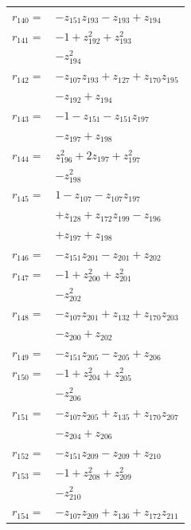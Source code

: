 \begin{longtable}{@{}r@{\;}l@{}}
\(r_{140}=\) & \(\displaystyle -z_{151}z_{193} -z_{193} +z_{194}\) \\[3pt]
\(r_{141}=\) & \(\displaystyle -1 +z_{192}^{2} +z_{193}^{2}\) \\
 & \(\displaystyle -z_{194}^{2}\) \\[3pt]
\(r_{142}=\) & \(\displaystyle -z_{107}z_{193} +z_{127} +z_{170}z_{195}\) \\
 & \(\displaystyle -z_{192} +z_{194}\) \\[3pt]
\(r_{143}=\) & \(\displaystyle -1 -z_{151} -z_{151}z_{197}\) \\
 & \(\displaystyle -z_{197} +z_{198}\) \\[3pt]
\(r_{144}=\) & \(\displaystyle z_{196}^{2} +2z_{197} +z_{197}^{2}\) \\
 & \(\displaystyle -z_{198}^{2}\) \\[3pt]
\(r_{145}=\) & \(\displaystyle 1 -z_{107} -z_{107}z_{197}\) \\
 & \(\displaystyle +z_{128} +z_{172}z_{199} -z_{196}\) \\
 & \(\displaystyle +z_{197} +z_{198}\) \\[3pt]
\(r_{146}=\) & \(\displaystyle -z_{151}z_{201} -z_{201} +z_{202}\) \\[3pt]
\(r_{147}=\) & \(\displaystyle -1 +z_{200}^{2} +z_{201}^{2}\) \\
 & \(\displaystyle -z_{202}^{2}\) \\[3pt]
\(r_{148}=\) & \(\displaystyle -z_{107}z_{201} +z_{132} +z_{170}z_{203}\) \\
 & \(\displaystyle -z_{200} +z_{202}\) \\[3pt]
\(r_{149}=\) & \(\displaystyle -z_{151}z_{205} -z_{205} +z_{206}\) \\[3pt]
\(r_{150}=\) & \(\displaystyle -1 +z_{204}^{2} +z_{205}^{2}\) \\
 & \(\displaystyle -z_{206}^{2}\) \\[3pt]
\(r_{151}=\) & \(\displaystyle -z_{107}z_{205} +z_{135} +z_{170}z_{207}\) \\
 & \(\displaystyle -z_{204} +z_{206}\) \\[3pt]
\(r_{152}=\) & \(\displaystyle -z_{151}z_{209} -z_{209} +z_{210}\) \\[3pt]
\(r_{153}=\) & \(\displaystyle -1 +z_{208}^{2} +z_{209}^{2}\) \\
 & \(\displaystyle -z_{210}^{2}\) \\[3pt]
\(r_{154}=\) & \(\displaystyle -z_{107}z_{209} +z_{136} +z_{172}z_{211}\) \\

\end{longtable}
